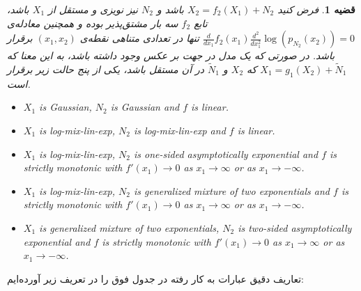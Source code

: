 \documentclass[a4paper,12pt]{article}
\newtheorem{thm}{{\large\bf قضیه}}[section]
\begin{document}
\begin{thm}
	فرض کنید 
	$X_2 = f_2(X_1) + N_2$
	باشد و  $N_2$ نیز نویزی 
	و مستقل از $X_1$ باشد، تابع $f_2$ سه بار مشتق‌پذیر بوده و همچنین معادله‌ی 
	$\frac{d}{dx_1}f_2(x_1)\frac{d^2}{dx_1^2}\log (p_{N_2}(x_2)) = 0$
	تنها در تعدادی متناهی نقطه‌ی 
	$(x_1, x_2)$
	برقرار باشد. در صورتی که یک مدل در جهت بر عکس وجود داشته باشد، به این معنا که
	$X_1 = g_1(X_2) + \tilde N_1$
	که $X_2$ و
	$\tilde N_1$
	در آن مستقل باشد، یکی از پنج حالت زیر برقرار است.
\begin{latin}
\begin{itemize}
	\item[I.] $X_1$ is Gaussian, $N_2$ is Gaussian and $f$ is linear.
	\item[II.] $X_1$ is log-mix-lin-exp, $N_2$ is log-mix-lin-exp and $f$ is linear.
	\item[III.] $X_1$ is log-mix-lin-exp, $N_2$ is one-sided asymptotically exponential and $f$ is strictly monotonic with $f'(x_1) \rightarrow 0$ as $x_1 \rightarrow \infty$ or as $x_1 \rightarrow -\infty$.
	\item[IV.] $X_1$ is log-mix-lin-exp, $N_2$ is generalized mixture of two exponentials and $f$ is strictly monotonic with $f'(x_1) \rightarrow 0$ as $x_1 \rightarrow \infty$ or as $x_1 \rightarrow -\infty$.
	\item[V.] $X_1$ is generalized mixture of two exponentials, $N_2$ is two-sided asymptotically exponential and $f$ is strictly monotonic with $f'(x_1) \rightarrow 0$ as $x_1 \rightarrow \infty$ or as $x_1 \rightarrow-\infty$. 
\end{itemize}
\end{latin}
\end{thm}
تعاریف دقیق عبارات به کار رفته در جدول فوق را در تعریف زیر آورده‌ایم:
\end{document}
